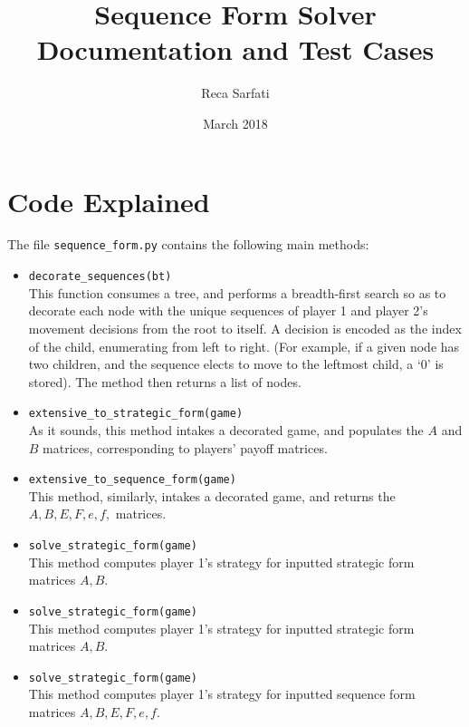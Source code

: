 \documentclass[11pt]{tufte-handout}
\title{Sequence Form Solver Documentation and Test Cases}
\author{Reca Sarfati}
\date{March 2018}
\theoremstyle{plain}
\theoremstyle{definition}
\theoremstyle{remark}
\begin{document}
\maketitle

\setcounter{section}{0}
\section{Code Explained}
The file \verb|sequence_form.py| contains the following main methods: \\ \begin{itemize}[-]
    \item \verb|decorate_sequences(bt)| \\
    This function consumes a tree, and performs a breadth-first search so as to decorate each node with the unique sequences of player 1 and player 2's movement decisions from the root to itself. A decision is encoded as the index of the child, enumerating from left to right. (For example, if a given node has two children, and the sequence elects to move to the leftmost child, a `0' is stored). The method then returns a list of nodes.
    
    \item \verb|extensive_to_strategic_form(game)| \\ As it sounds, this method intakes a decorated game, and populates the $A$ and $B$ matrices, corresponding to players' payoff  matrices.
    
    \item \verb|extensive_to_sequence_form(game)| \\ This method, similarly, intakes a decorated game, and returns the $A,B,E,F,e,f,$ matrices.
    
    \item \verb|solve_strategic_form(game)| \\ This method computes player 1's strategy for inputted strategic form matrices $A,B$.
    
    \item \verb|solve_strategic_form(game)| \\ This method computes player 1's strategy for inputted strategic form matrices $A,B$.
    
    \item \verb|solve_strategic_form(game)| \\ This method computes player 1's strategy for inputted sequence form matrices $A,B,E,F,e,f$.
\end{itemize} 
\end{document}
